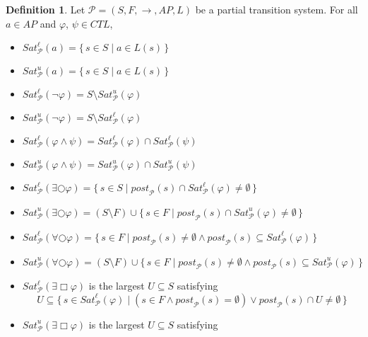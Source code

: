 \documentclass[12pt]{article}
\newcommand{\always}{\Box}
\newcommand{\nxt}{\bigcirc}
\theoremstyle{definition}
\newtheorem{definition}{Definition}
\begin{document}
\begin{definition}
Let $\mathcal{P} = (S, F, \rightarrow, \mathit{AP}, L)$ be a partial transition system.  For all $a \in \mathit{AP}$ and $\varphi$, $\psi \in \mathit{CTL}$,
\begin{itemize}
\item
$\mathit{Sat}^{\ell}_{\mathcal{P}}(a) = \{\, s \in S \mid a \in L(s) \,\}$
\item
$\mathit{Sat}^u_{\mathcal{P}}(a) = \{\, s \in S \mid a \in L(s) \,\}$
\item
$\mathit{Sat}^{\ell}_{\mathcal{P}}(\neg \varphi)  = S \setminus \mathit{Sat}^u_{\mathcal{P}}(\varphi)$
\item
$\mathit{Sat}^u_{\mathcal{P}}(\neg \varphi)  = S \setminus \mathit{Sat}^{\ell}_{\mathcal{P}}(\varphi)$
\item
$\mathit{Sat}^{\ell}_{\mathcal{P}}(\varphi \wedge \psi) = \mathit{Sat}^{\ell}_{\mathcal{P}}(\varphi) \cap \mathit{Sat}^{\ell}_{\mathcal{P}}(\psi)$
\item
$\mathit{Sat}^u_{\mathcal{P}}(\varphi \wedge \psi) = \mathit{Sat}^u_{\mathcal{P}}(\varphi) \cap \mathit{Sat}^u_{\mathcal{P}}(\psi)$
\item
$\mathit{Sat}^{\ell}_{\mathcal{P}}(\exists \nxt \varphi) = \{\, s \in S \mid \mathit{post}_{\mathcal{P}}(s) \cap \mathit{Sat}^{\ell}_{\mathcal{P}}(\varphi) \not= \emptyset \,\}$
\item
$\mathit{Sat}^u_{\mathcal{P}}(\exists \nxt \varphi) = (S \setminus F) \cup \{\, s \in F \mid \mathit{post}_{\mathcal{P}}(s) \cap \mathit{Sat}^u_{\mathcal{P}}(\varphi) \not= \emptyset \,\}$
\item
$\mathit{Sat}^{\ell}_{\mathcal{P}}(\forall \nxt \varphi) = \{\, s \in F \mid \mathit{post}_{\mathcal{P}}(s) \not= \emptyset \wedge \mathit{post}_{\mathcal{P}}(s) \subseteq \mathit{Sat}_{\mathcal{P}}^{\ell}(\varphi) \,\}$
\item
$\mathit{Sat}^u_{\mathcal{P}}(\forall \nxt \varphi) = (S \setminus F) \cup \{\, s \in F \mid \mathit{post}_{\mathcal{P}}(s) \not= \emptyset \wedge \mathit{post}_{\mathcal{P}}(s) \subseteq \mathit{Sat}^u_{\mathcal{P}}(\varphi)  \,\}$
\item
$\mathit{Sat}^{\ell}_{\mathcal{P}}(\exists \always \varphi)$ is the largest $U \subseteq S$ satisfying
\[
U \subseteq \{\, s \in \mathit{Sat}^{\ell}_{\mathcal{P}}(\varphi) \mid (s \in F \wedge \mathit{post}_{\mathcal{P}}(s) = \emptyset) \vee \mathit{post}_{\mathcal{P}}(s) \cap U \not= \emptyset \,\}
\]
\item
$\mathit{Sat}^u_{\mathcal{P}}(\exists \always \varphi)$ is the largest $U \subseteq S$ satisfying

\end{itemize}
\end{definition}
\end{document}

